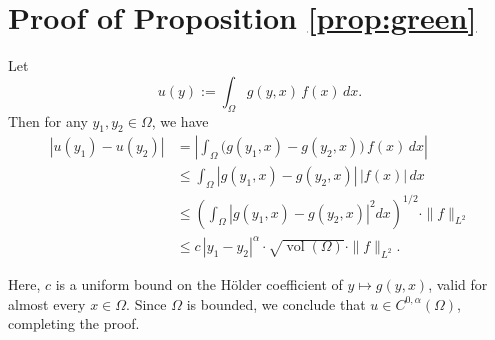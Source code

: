 \documentclass[11pt]{article}
\theoremstyle{plain}
\begin{document}
\section{Proof of Proposition \ref{prop:green}}\label{appdx:proof_green}


Let
\[
u(y) := \int_{\Omega} g(y, x)\, f(x)\, dx.
\]
Then for any $ y_1, y_2 \in \Omega $, we have
\begin{equation*}
\begin{split}
|u(y_1) - u(y_2)|
&= \left| \int_{\Omega} \big( g(y_1, x) - g(y_2, x) \big)\, f(x)\, dx \right| \\
&\leq \int_{\Omega} |g(y_1, x) - g(y_2, x)|\, |f(x)|\, dx \\
&\leq \left( \int_{\Omega} |g(y_1, x) - g(y_2, x)|^2 dx \right)^{1/2} \cdot \|f\|_{L^2} \\
&\leq c\, |y_1 - y_2|^{\alpha} \cdot \sqrt{\operatorname{vol}(\Omega)} \cdot \|f\|_{L^2}.
\end{split}
\end{equation*}

Here, $ c $ is a uniform bound on the Hölder coefficient of $ y \mapsto g(y,x) $, valid for almost every $ x \in \Omega $. Since $ \Omega $ is bounded, we conclude that $ u \in C^{0,\alpha}(\Omega) $, completing the proof.
\end{document}
